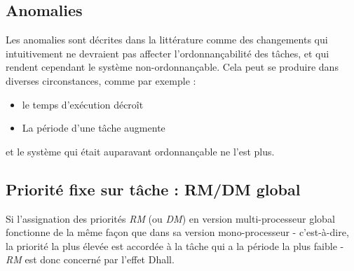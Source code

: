 \documentclass[11pt,a4paper,oneside]{report}
\begin{document}
	\subsection{Anomalies}
	Les anomalies sont décrites dans la littérature comme des changements qui intuitivement ne devraient 
	pas affecter l'ordonnançabilité des tâches, et qui rendent cependant le système non-ordonnançable. 
	Cela peut se produire dans diverses circonstances, comme par exemple :\medskip
	\begin{itemize}
		\item le temps d'exécution décroît
		\item La période d'une tâche augmente
	\end{itemize}
	et le système qui était auparavant ordonnançable ne l'est plus.
	
	
	
	\subsection{Priorité fixe sur tâche : RM/DM global}
	Si l'assignation des priorités \textit{RM} (ou \textit{DM}) en version multi-processeur global 
	fonctionne de la même façon que dans sa version mono-processeur - 
	c'est-à-dire, la priorité la plus élevée est accordée à la tâche qui a la période la plus faible - 
	\textit{RM} est donc concerné par l'effet Dhall. \medskip
	
	
\end{document}
